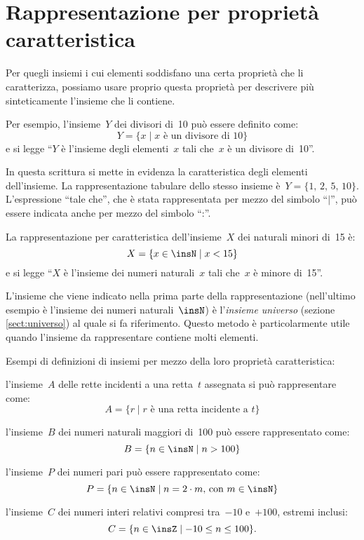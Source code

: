 \section{Rappresentazione per proprietà caratteristica}

Per quegli insiemi i cui elementi soddisfano una certa proprietà che
li caratterizza, possiamo usare proprio questa proprietà per
descrivere più sinteticamente l'insieme che li contiene.

Per esempio, l'insieme~$Y$ dei divisori di~10 può essere definito come: \[Y=\{x\mid x \text{ è un divisore di }10\}\]
e si legge ``$Y$ è l'insieme degli elementi~$x$ tali che~$x$ è un divisore di~10''.

In questa scrittura si mette in evidenza la caratteristica degli elementi dell'insieme.
La rappresentazione tabulare dello stesso insieme è~$Y=\{\text{1, 2, 5, 10}\}$. L'espressione ``tale che'', che è stata rappresentata per mezzo del simbolo ``$|$'', può essere indicata anche per mezzo del simbolo ``:''.

La rappresentazione per caratteristica dell'insieme~$X$
dei naturali minori di~15 è: \[X=\{x\in\insN\mid x<15\}\]
e si legge ``$X$ è l'insieme dei numeri naturali~$x$ tali che~$x$ è minore di~15''.

L'insieme che viene indicato nella prima parte della rappresentazione (nell'ultimo esempio è
l'insieme dei numeri naturali~$\insN$) è l'\textit{insieme universo} (sezione \ref{sect:universo}) al quale si fa riferimento.
Questo metodo è particolarmente utile quando l'insieme da rappresentare contiene molti elementi.

\begin{exrig}
 \begin{esempio}
 Esempi di definizioni di insiemi per mezzo della loro proprietà caratteristica:
 \begin{enumeratea}
\item l'insieme~$A$ delle rette incidenti a una retta~$t$ assegnata si può rappresentare come:
\[A=\{r\mid r\text{ è una retta incidente a } t\}\]
\item l'insieme~$B$ dei numeri naturali maggiori di~100 può essere rappresentato come:
\[B=\{n\in\insN\mid n>100\}\]
\item l'insieme~$P$ dei numeri pari può essere rappresentato come:
\[P=\{n\in\insN\mid n=2\cdot m\text{, con }m\in\insN\}\]
\item l'insieme~$C$ dei numeri interi relativi compresi tra~$-10$ e~$+100$, estremi inclusi:
\[C=\{n\in\insZ\mid -10\le n\le 100\}.\]
\end{enumeratea}
 \end{esempio}
\end{exrig}

